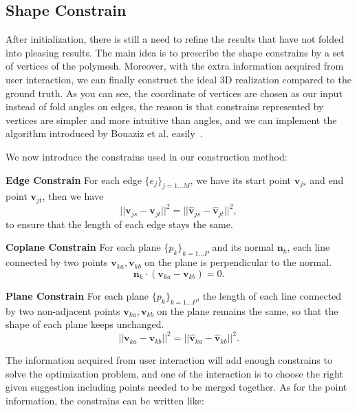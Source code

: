 \documentclass[submission]{gmp2018}
\begin{document}

\subsection{Shape Constrain}
After initialization, there is still a need to refine the results that have not folded into pleasing results. The main idea is to prescribe the shape constrains by a set of vertices of the polymesh. Moreover, with the extra information acquired from user interaction, we can finally construct the ideal 3D realization compared to the ground truth. As you can see, the coordinate of vertices are chosen as our input instead of fold angles on edges, the reason is that constrains represented by vertices are simpler and more intuitive than angles, and we can implement the algorithm introduced by Bouaziz et al. easily~\cite{Bouaziz:2012:SSD:2346796.2346802}.

We now introduce the constrains used in our construction method:

\noindent
\textbf{Edge Constrain} For each edge $\{e_j\}_{j=1...M}$, we have its start point $\mathbf{v}_{js}$ and end point $\mathbf{v}_{jt}$, then we have 
\begin{equation}
||\mathbf{v}_{js} - \mathbf{v}_{jt}||^2 = ||\mathbf{\hat{v}}_{js} - \mathbf{\hat{v}}_{jt}||^2,
\label{equ:edge}
\end{equation}
to ensure that the length of each edge stays the same.

\noindent
\textbf{Coplane Constrain} For each plane $\{p_k\}_{k=1 \dots P}$ and its normal $\mathbf{n}_k$, each line connected by two points $\mathbf{v}_{ka}, \mathbf{v}_{kb}$ on the plane is perpendicular to the normal.
\begin{equation}
\mathbf{n}_k \cdot (\mathbf{v}_{ka} - \mathbf{v}_{kb}) = 0.
\label{equ:coplane}
\end{equation}

\noindent
\textbf{Plane Constrain} For each plane $\{p_k\}_{k=1 \dots P}$, the length of each line connected by two non-adjacent points $\mathbf{v}_{ka}, \mathbf{v}_{kb}$ on the plane remains the same, so that the shape of each plane keeps unchanged.
\begin{equation}
||\mathbf{v}_{ka} - \mathbf{v}_{kb}||^2 = ||\hat{\mathbf{v}}_{ka} - \hat{\mathbf{v}}_{kb}||^2.
\label{equ:plane}
\end{equation}

The information acquired from user interaction will add enough constrains to solve the optimization problem, and one of the interaction is to choose the right given suggestion including points needed to be merged together. As for the point information, the constrains can be written like:
\end{document}
